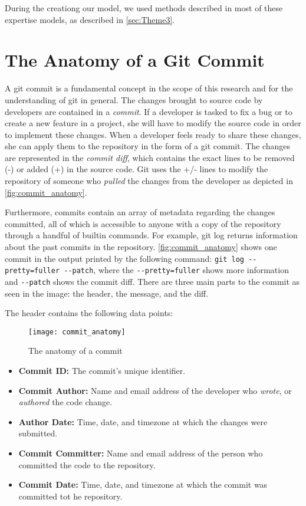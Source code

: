 During the creationg our model, we used methods described in most of these expertise models, as described in \autoref{sec:Theme3}.


\section{The Anatomy of a Git Commit}
\label{sec:commit_anatomy}

A git commit is a fundamental concept in the scope of this research and for the understanding of git in general. The changes brought to source code by developers are contained in a \textit{commit}. If a developer is tasked to fix a bug or to create a new feature in a project, she will have to modify the source code in order to implement these changes. When a developer feels ready to share these changes, she can apply them to the repository in the form of a git commit. The changes are represented in the \textit{commit diff}, which contains the exact lines to be removed (-) or added (+) in the source code. Git uses the +/- lines to modify the repository of someone who \textit{pulled} the changes from the developer as depicted in \autoref{fig:commit_anatomy}. 

Furthermore, commits contain an array of metadata regarding the changes committed, all of which is accessible to anyone with a copy of the repository through a handful of builtin commands. For example, git log returns information about the past commits in the repository. \autoref{fig:commit_anatomy} shows one commit in the output printed by the following command: \texttt{git log -{}-pretty=fuller -{}-patch}, where the \texttt{-{}-pretty=fuller} shows more information and \texttt{-{}-patch} shows the commit diff. There are three main parts to the commit as seen in the image: the header, the  message, and the diff.

The header contains the following data points:

\begin{figure}[htb]
\centering
\texttt{[image: commit\_anatomy]}
\caption{The anatomy of a commit}
\label{fig:commit_anatomy}
\end{figure}

\begin{itemize}
	\item \textbf{Commit ID:} The commit's unique identifier.
	\item \textbf{Commit Author:} Name and email address of the developer who \textit{wrote}, or \textit{authored} the code change.
	\item \textbf{Author Date:} Time, date, and timezone at which the changes were submitted.
	\item \textbf{Commit Committer:} Name and email address of the person who committed the code to the repository.
	\item \textbf{Commit Date:} Time, date, and timezone at which the commit was committed tot he repository.
\end{itemize}

